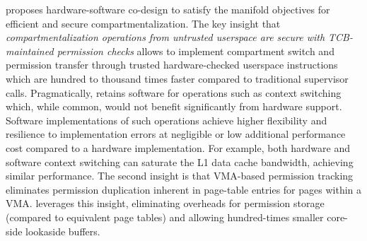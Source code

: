 \seccells proposes hardware-software co-design to satisfy the
manifold objectives for efficient and secure compartmentalization.
The key insight that \emph{compartmentalization operations from untrusted userspace
are secure with TCB-maintained permission checks} allows \seccells to
implement compartment switch and permission transfer through
trusted hardware-checked userspace instructions which are
hundred to thousand times faster compared to traditional supervisor calls.
Pragmatically, \seccells retains software for operations such as 
context switching which, while common, would not benefit significantly 
from hardware support.
Software implementations of such operations achieve higher flexibility and
resilience to implementation errors at negligible or low additional performance
cost compared to a hardware implementation.
For example, both hardware and software context switching can saturate
the L1 data cache bandwidth, achieving similar performance.
The second insight is that VMA-based permission tracking eliminates 
permission duplication inherent in page-table entries for pages 
within a VMA.
\seccells leverages this insight, eliminating overheads for 
permission storage (compared to equivalent page tables) and 
allowing hundred-times smaller core-side lookaside buffers. 

